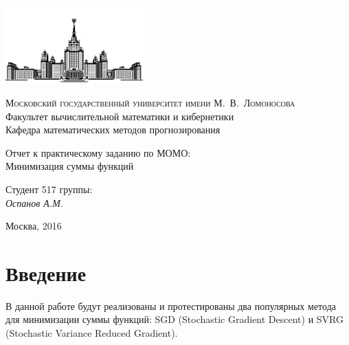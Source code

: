 \documentclass[12pt, a4paper]{article}
\begin{document}
    \thispagestyle{empty}

    \begin{singlespace}
    \begin{titlepage}
        \begin{center}
            \includegraphics[height = 3cm]{msu.png}

            {\scshape Московский государственный университет имени М.~В.~Ломоносова}\\
            Факультет вычислительной математики и кибернетики\\
            Кафедра математических методов прогнозирования\\
            \centerline{\hfill\hrulefill\hrulefill\hrulefill\hrulefill\hfill}

            \vfill

            {\LARGE Отчет к практическому заданию  по МОМО: \\ Минимизация суммы функций}

            \vspace{1cm}

        \end{center}

        \vfill

        \begin{flushright}
            Студент 517 группы:\\
                \textit{Оспанов А.М.}

            \vspace{5mm}

        \end{flushright}

        \vfill

        \begin{center}
            Москва, 2016
        \end{center}
    \end{titlepage}
    \end{singlespace}

    \newpage


    \section{Введение}
    В данной работе будут реализованы и протестированы два популярных метода для минимизации суммы функций:
    SGD (Stochastic Gradient Descent) и SVRG (Stochastic Variance Reduced Gradient).
\end{document}
